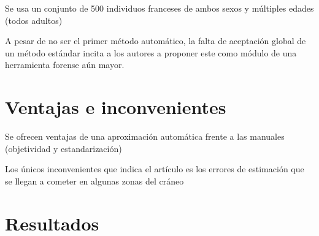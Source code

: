 \documentclass[13pt,a4paper]{article}
\begin{document}

Se usa un conjunto de 500 individuos franceses de ambos sexos y múltiples edades (todos adultos)

A pesar de no ser el primer método automático, la falta de aceptación global de un método estándar incita a los autores a proponer este como módulo de una herramienta forense aún mayor.








\section{Ventajas e inconvenientes}

Se ofrecen ventajas de una aproximación automática frente a las manuales (objetividad y estandarización)

Los únicos inconvenientes que indica el artículo es los errores de estimación que se llegan a cometer en algunas zonas del cráneo

\section{Resultados}
\end{document}
